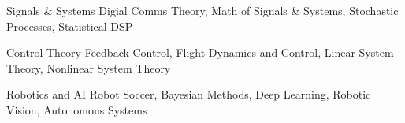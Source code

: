 

\begin{cvskills}

  \cvskill
    {Signals \& Systems} %
    {Digial Comms Theory, Math of Signals \& Systems, Stochastic Processes, Statistical DSP} %

  \cvskill
    {Control Theory} %
    {Feedback Control, Flight Dynamics and Control, Linear System Theory, Nonlinear System Theory} %

  \cvskill
    {Robotics and AI} %
    {Robot Soccer, Bayesian Methods, Deep Learning, Robotic Vision, Autonomous Systems} %

\end{cvskills}
